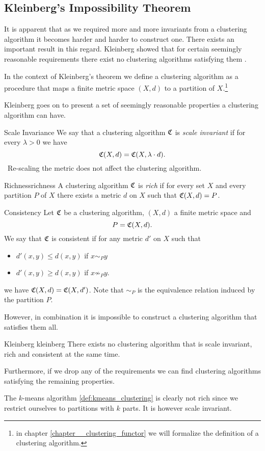 \subsection{Kleinberg's Impossibility Theorem}
It is apparent that as we required more and more invariants from a clustering algorithm it becomes harder and harder to construct one.
There exists an important result in this regard.
Kleinberg showed that for certain seemingly reasonable requirements there exist no clustering algorithms satisfying them \cite{Kleinberg2002}.

In the context of Kleinberg's theorem we define a clustering algorithm as a procedure that maps a finite metric space $(X,d)$ to a partition of $X$.\footnote{in chapter \ref{chapter__clustering_functor} we will formalize the definition of a clustering algorithm.}

Kleinberg goes on to present a set of seemingly reasonable properties a clustering algorithm can have.

\begin{definition}{Scale Invariance}{}
We say that a clustering algorithm $\mathfrak{C}$ is \emph{scale invariant} if for every $\lambda > 0$ we have
$$
\mathfrak{C}(X,d) = \mathfrak{C}(X, \lambda \cdot d).
$$
\Ie\ Re-scaling the metric does not affect the clustering algorithm.
\end{definition}

\begin{definition}{Richness}{richness}
A clustering algorithm $\mathfrak{C}$ is \emph{rich} if for every set $X$ and every partition $P$ of $X$ there exists a metric $d$ on $X$ such that $\mathfrak{C}(X,d) = P$.
\end{definition}

\begin{definition}{Consistency}{}
Let $\mathfrak{C}$ be a clustering algorithm, $(X,d)$ a finite metric space and
$$
P = \mathfrak{C}(X,d).
$$
We say that $\mathfrak{C}$ is consistent if for any metric $d'$ on $X$ such that
\begin{itemize}
    \item $d'(x,y) \leq d(x,y)$ if $x\sim_P y$
    \item $d'(x,y) \geq d(x,y)$ if $x \not\sim_P y$.
\end{itemize}
we have $\mathfrak{C}(X,d) = \mathfrak{C}(X,d')$. Note that $\sim_P$ is the equivalence relation induced by the partition $P$.
\end{definition}


However, in combination it is impossible to construct a clustering algorithm that satisfies them all.


\begin{theorem}{Kleinberg \cite[Theorem~2.1]{Kleinberg2002}}{kleinberg}
There exists no clustering algorithm that is scale invariant, rich and consistent at the same time.
\end{theorem}

Furthermore, if we drop any of the requirements we can find clustering algorithms satisfying the remaining properties.

The $k$-means algorithm \ref{def:kmeans_clustering} is clearly not rich since we restrict ourselves to partitions with $k$ parts. It is however scale invariant.

